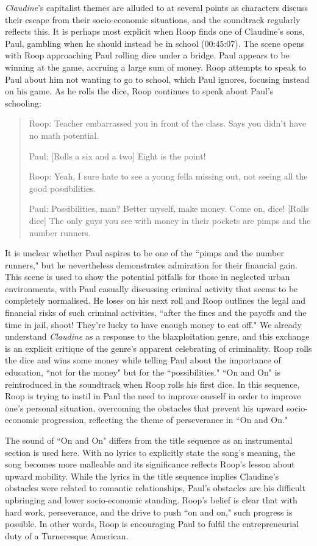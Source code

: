 \textit{Claudine}'s capitalist themes are alluded to at several points as characters discuss their escape from their socio-economic situations, and the soundtrack regularly reflects this.
It is perhaps most explicit when Roop finds one of Claudine's sons, Paul, gambling when he should instead be in school (00:45:07).
The scene opens with Roop approaching Paul rolling dice under a bridge.
Paul appears to be winning at the game, accruing a large sum of money.
Roop attempts to speak to Paul about him not wanting to go to school, which Paul ignores, focusing instead on his game.
As he rolls the dice, Roop continues to speak about Paul's schooling: 
\begin{quote}
Roop: Teacher embarrassed you in front of the class. Says you didn't have no math potential.

Paul: [Rolls a six and a two] Eight is the point!

Roop: Yeah, I sure hate to see a young fella missing out, not seeing all the good possibilities.

Paul: Possibilities, man? Better myself, make money. Come on, dice! [Rolls dice] The only guys you see with money in their pockets are pimps and the number runners.
\end{quote}
It is unclear whether Paul aspires to be one of the ``pimps and the number runners," but he nevertheless demonstrates admiration for their financial gain.
This scene is used to show the potential pitfalls for those in neglected urban environments, with Paul casually discussing criminal activity that seems to be completely normalised.
He loses on his next roll and Roop outlines the legal and financial risks of such criminal activities, ``after the fines and the payoffs and the time in jail, shoot! They're lucky to have enough money to eat off."
We already understand \textit{Claudine} as a response to the blaxploitation genre, and this exchange is an explicit critique of the genre's apparent celebrating of criminality.
Roop rolls the dice and wins some money while telling Paul about the importance of education, ``not for the money" but for the ``possibilities."
``On and On" is reintroduced in the soundtrack when Roop rolls his first dice.
In this sequence, Roop is trying to instil in Paul the need to improve oneself in order to improve one's personal situation, overcoming the obstacles that prevent his upward socio-economic progression, reflecting the theme of perseverance in ``On and On."

The sound of ``On and On" differs from the title sequence as an instrumental section is used here.
With no lyrics to explicitly state the song's meaning, the song becomes more malleable and its significance reflects Roop's lesson about upward mobility.
While the lyrics in the title sequence implies Claudine's obstacles were related to romantic relationships, Paul's obstacles are his difficult upbringing and lower socio-economic standing.
Roop's belief is clear that with hard work, perseverance, and the drive to push ``on and on," such progress is possible.
In other words, Roop is encouraging Paul to fulfil the entrepreneurial duty of a Turneresque American.

